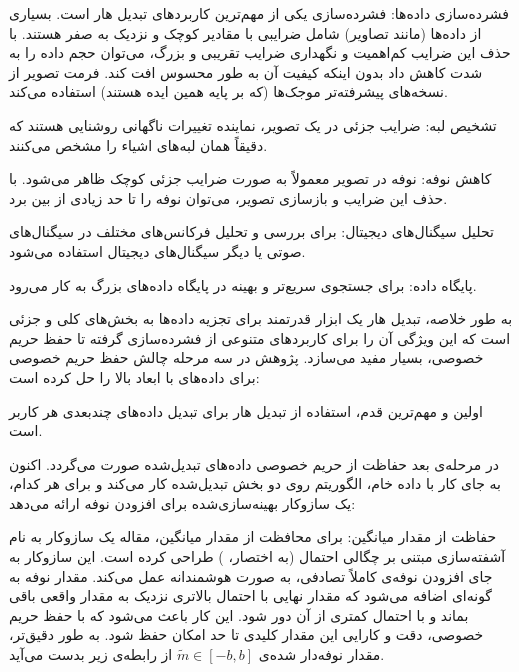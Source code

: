 
 فشرده‌سازی داده‌ها: فشرده‌سازی یکی از مهم‌ترین کاربردهای تبدیل هار است. بسیاری از داده‌ها (مانند تصاویر) شامل ضرایبی با مقادیر کوچک و نزدیک به صفر هستند. با حذف این ضرایب کم‌اهمیت و نگهداری ضرایب تقریبی و بزرگ، می‌توان حجم داده را به شدت کاهش داد بدون اینکه کیفیت آن به طور محسوس افت کند. فرمت تصویر  از نسخه‌های پیشرفته‌تر موجک‌ها (که بر پایه همین ایده هستند) استفاده می‌کند.

 تشخیص لبه: ضرایب جزئی در یک تصویر، نماینده تغییرات ناگهانی روشنایی هستند که دقیقاً همان لبه‌های اشیاء را مشخص می‌کنند.

 کاهش نوفه: نوفه در تصویر معمولاً به صورت ضرایب جزئی کوچک ظاهر می‌شود. با حذف این ضرایب و بازسازی تصویر، می‌توان نوفه را تا حد زیادی از بین برد.

 تحلیل سیگنال‌های دیجیتال: برای بررسی و تحلیل فرکانس‌های مختلف در سیگنال‌های صوتی یا دیگر سیگنال‌های دیجیتال استفاده می‌شود.

 پایگاه داده: برای جستجوی سریع‌تر و بهینه در پایگاه داده‌های بزرگ به کار می‌رود.


به طور خلاصه، تبدیل هار یک ابزار قدرتمند برای تجزیه داده‌ها به بخش‌های کلی و جزئی است که این ویژگی آن را برای کاربردهای متنوعی از فشرده‌سازی گرفته تا حفظ حریم خصوصی، بسیار مفید می‌سازد. پژوهش  در سه مرحله چالش حفظ حریم خصوصی برای داده‌های با ابعاد بالا را حل کرده است:

اولین و مهم‌ترین قدم، استفاده از تبدیل هار برای تبدیل داده‌های چندبعدی هر کاربر است. 

در مرحله‌ی بعد حفاظت از حریم خصوصی داده‌های تبدیل‌شده صورت می‌گردد. اکنون به جای کار با داده خام، الگوریتم روی دو بخش تبدیل‌شده کار می‌کند و برای هر کدام، یک سازوکار بهینه‌سازی‌شده برای افزودن نوفه ارائه می‌دهد:


 حفاظت از مقدار میانگین:  برای محافظت از مقدار میانگین، مقاله یک سازوکار به نام آشفته‌سازی مبتنی بر چگالی احتمال (به اختصار، ) طراحی کرده است. این سازوکار به جای افزودن نوفه‌ی کاملاً تصادفی، به صورت هوشمندانه عمل می‌کند. مقدار نوفه به گونه‌ای اضافه می‌شود که مقدار نهایی با احتمال بالاتری نزدیک به مقدار واقعی باقی بماند و با احتمال کمتری از آن دور شود. این کار باعث می‌شود که با حفظ حریم خصوصی، دقت و کارایی این مقدار کلیدی تا حد امکان حفظ شود. به طور دقیق‌تر، مقدار نوفه‌دار شده‌ی $\tilde{m} \in [-b,b]$ از رابطه‌ی زیر بدست می‌آید.

